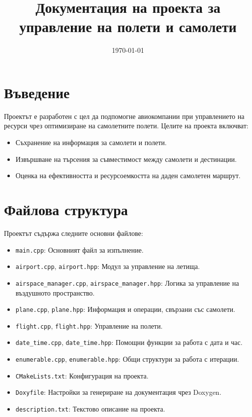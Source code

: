 \documentclass[a4paper,12pt]{article}
\title{Документация на проекта за управление на полети и самолети}
\author{}
\date{\today}
\begin{document}
\maketitle

\tableofcontents
\newpage

\section{Въведение}
Проектът е разработен с цел да подпомогне авиокомпании при управлението на ресурси чрез оптимизиране на самолетните полети. 
Целите на проекта включват:
\begin{itemize}
    \item Съхранение на информация за самолети и полети.
    \item Извършване на търсения за съвместимост между самолети и дестинации.
    \item Оценка на ефективността и ресурсоемкостта на даден самолетен маршрут.
\end{itemize}

\section{Файлова структура}
Проектът съдържа следните основни файлове:
\begin{itemize}
    \item \texttt{main.cpp}: Основният файл за изпълнение.
    \item \texttt{airport.cpp}, \texttt{airport.hpp}: Модул за управление на летища.
    \item \texttt{airspace\_manager.cpp}, \texttt{airspace\_manager.hpp}: Логика за управление на въздушното пространство.
    \item \texttt{plane.cpp}, \texttt{plane.hpp}: Информация и операции, свързани със самолети.
    \item \texttt{flight.cpp}, \texttt{flight.hpp}: Управление на полети.
    \item \texttt{date\_time.cpp}, \texttt{date\_time.hpp}: Помощни функции за работа с дата и час.
    \item \texttt{enumerable.cpp}, \texttt{enumerable.hpp}: Общи структури за работа с итерации.
    \item \texttt{CMakeLists.txt}: Конфигурация на проекта.
    \item \texttt{Doxyfile}: Настройки за генериране на документация чрез Doxygen.
    \item \texttt{description.txt}: Текстово описание на проекта.
\end{itemize}
\end{document}
